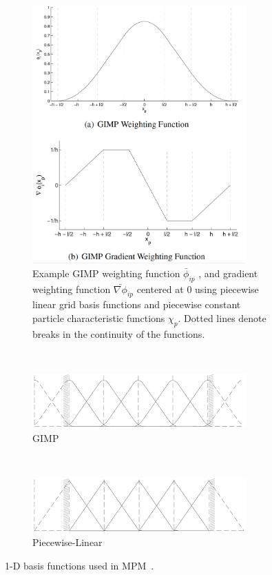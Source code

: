 \begin{figure}[tbhp]
	\centering
	\begin{subfigure}[b]{0.7\textwidth}
	\centering
	\includegraphics[width=0.9\textwidth]{gimp}
	\caption{Example GIMP weighting function $\bar{\phi}_{ip}$ ,
	and gradient weighting function $\bar{\nabla\phi}_{ip}$ centered at 0 using 
	piecewise linear grid basis functions and piecewise constant particle 
	characteristic functions $\chi_p$. Dotted lines denote breaks in the 
	continuity
	of the functions.}
	\label{fig:gimp}
	\end{subfigure}\\
	\begin{subfigure}[b]{0.9\textwidth}
		\centering
		\includegraphics[width=0.9\textwidth]{GIMP_function}
		\caption{GIMP}
		\label{fig:GIMP_function}
	\end{subfigure}\\
	\begin{subfigure}[b]{0.9\textwidth}
		\centering
		\includegraphics[width=0.9\textwidth]{MPM_Linear}
		\caption{Piecewise-Linear}
		\label{fig:MPM_Linear}
	\end{subfigure} 
	\caption{1-D basis functions used in MPM~\citep{Steffen2008}.}
	\label{fig:MPM_GIMP_func}
\end{figure}

